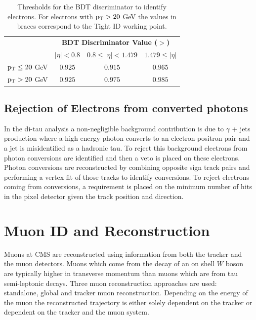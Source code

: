 \begin{table}[!ht]
\begin{center}
\begin{tabular}{|l|c|c|c|}
\multicolumn{1}{c}{ }      & \multicolumn{3}{c}{\bf BDT Discriminator Value ($>$)}                 \\
\cline{2-4}
\multicolumn{1}{c|}{ }     & $|\eta|<0.8$      & $0.8 \leq |\eta| < 1.479$  & $1.479 \leq |\eta|$  \\
\hline
$\mathrm{p_{T}}\leq 20$ GeV          & $0.925$           & $0.915$                    & $0.965$              \\
$\mathrm{p_{T}}>    20$ GeV          & $0.925$ & $0.975$          & $0.985$    \\
\hline
\end{tabular}
\caption{
  Thresholds for the BDT discriminator to identify electrons. For electrons with $\mathrm{p_{T}}>20$ GeV the values in braces correspond to the Tight ID working point.}
\label{tab:ElectronID-Thresholds}
\end{center}
\end{table}

\subsection{Rejection of Electrons from converted photons} %
In the di-tau analysis a non-negligible background contribution 
is due to $\gamma$ + jets production where a high energy
photon converts to an electron-positron pair and a jet is
misidentified as a hadronic tau. To reject this background
electrons from photon conversions are identified and then 
a veto is placed on these electrons.
Photon conversions %
are reconstructed by combining opposite sign track pairs and performing
a vertex fit of those tracks to identify conversions.
To reject electrons coming from conversions, a requirement is placed
on the minimum number of hits in the pixel detector given the
track position and direction.

\section{Muon ID and Reconstruction}
Muons at CMS are reconstructed using information from both the 
tracker and the muon detectors. Muons which come from the decay
of an on shell $W$ boson are typically higher in transverse momentum
than muons which are from tau semi-leptonic decays.
Three muon reconstruction approaches are used: standalone,
global and tracker muon reconstruction. Depending on the 
energy of the muon the reconstructed trajectory is either
solely dependent on the tracker or dependent on the tracker
and the muon system.
